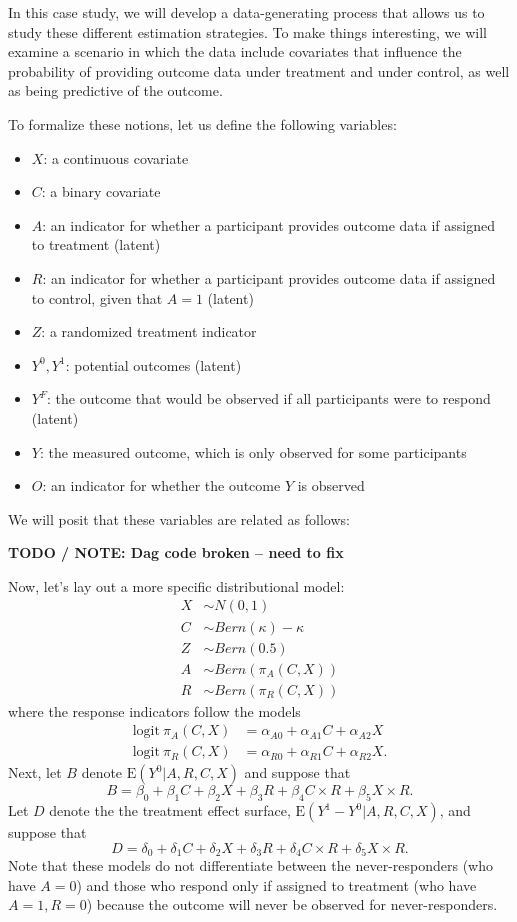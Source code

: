 \documentclass[
]{book}
\providecommand{\tightlist}{%
  \setlength{\itemsep}{0pt}\setlength{\parskip}{0pt}}
\begin{document}
In this case study, we will develop a data-generating process that allows us to study these different estimation strategies. To make things interesting, we will examine a scenario in which the data include covariates that influence the probability of providing outcome data under treatment and under control, as well as being predictive of the outcome.

To formalize these notions, let us define the following variables:

\begin{itemize}
\tightlist
\item
  \(X\): a continuous covariate
\item
  \(C\): a binary covariate
\item
  \(A\): an indicator for whether a participant provides outcome data if assigned to treatment (latent)
\item
  \(R\): an indicator for whether a participant provides outcome data if assigned to control, given that \(A = 1\) (latent)
\item
  \(Z\): a randomized treatment indicator
\item
  \(Y^0, Y^1\): potential outcomes (latent)
\item
  \(Y^F\): the outcome that would be observed if all participants were to respond (latent)
\item
  \(Y\): the measured outcome, which is only observed for some participants
\item
  \(O\): an indicator for whether the outcome \(Y\) is observed
\end{itemize}

We will posit that these variables are related as follows:

\textbf{TODO / NOTE: Dag code broken -- need to fix}

Now, let's lay out a more specific distributional model:
\[
\begin{aligned}
X &\sim N(0,1) \\
C &\sim Bern(\kappa) - \kappa\\
Z &\sim Bern(0.5) \\
A &\sim Bern\left(\pi_A(C,X)\right) \\
R &\sim Bern\left(\pi_R(C,X)\right)
\end{aligned}
\]
where the response indicators follow the models
\[
\begin{aligned}
\text{logit} \ \pi_A(C,X) &= \alpha_{A0} + \alpha_{A1} C + \alpha_{A2} X \\
\text{logit} \ \pi_R(C,X) &= \alpha_{R0} + \alpha_{R1} C + \alpha_{R2} X.
\end{aligned}
\]
Next, let \(B\) denote \(\text{E}(Y^0 | A, R, C, X)\) and suppose that
\[
B = \beta_0 + \beta_1 C + \beta_2 X + \beta_3 R + \beta_4 C \times R + \beta_5 X \times R.
\]
Let \(D\) denote the the treatment effect surface, \(\text{E}(Y^1 - Y^0 | A, R, C, X)\), and suppose that
\[
D = \delta_0 + \delta_1 C + \delta_2 X + \delta_3 R + \delta_4 C \times R + \delta_5 X \times R.
\]
Note that these models do not differentiate between the never-responders (who have \(A = 0\)) and those who respond only if assigned to treatment (who have \(A = 1, R = 0\)) because the outcome will never be observed for never-responders.
\end{document}
